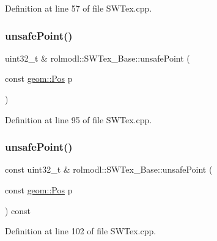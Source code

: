 Definition at line 57 of file S\+W\+Tex.\+cpp.

\mbox{\label{classrolmodl_1_1_s_w_tex___base_ad506dc816121f170d877fd9ad04ec75b}} 
\subsubsection{\texorpdfstring{unsafePoint()}{unsafePoint()}\hspace{0.1cm}{\footnotesize\ttfamily [1/2]}}
{\footnotesize\ttfamily uint32\+\_\+t \& rolmodl\+::\+S\+W\+Tex\+\_\+\+Base\+::unsafe\+Point (\begin{DoxyParamCaption}\item[{const \mbox{\hyperlink{structrolmodl_1_1geom_1_1_pos}{geom\+::\+Pos}}}]{p }\end{DoxyParamCaption})\hspace{0.3cm}{\ttfamily [noexcept]}}



Definition at line 95 of file S\+W\+Tex.\+cpp.

\mbox{\label{classrolmodl_1_1_s_w_tex___base_a6e7f7d6235f3327dc899d6e2e6ad390b}} 
\subsubsection{\texorpdfstring{unsafePoint()}{unsafePoint()}\hspace{0.1cm}{\footnotesize\ttfamily [2/2]}}
{\footnotesize\ttfamily const uint32\+\_\+t \& rolmodl\+::\+S\+W\+Tex\+\_\+\+Base\+::unsafe\+Point (\begin{DoxyParamCaption}\item[{const \mbox{\hyperlink{structrolmodl_1_1geom_1_1_pos}{geom\+::\+Pos}}}]{p }\end{DoxyParamCaption}) const\hspace{0.3cm}{\ttfamily [noexcept]}}



Definition at line 102 of file S\+W\+Tex.\+cpp.

\mbox{\label{classrolmodl_1_1_s_w_tex___base_a8ecdb8f5e18f854e1754dad6b2834d47}} 
